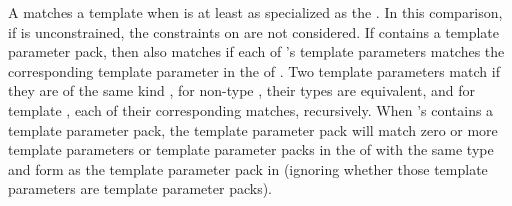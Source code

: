 \documentclass{wg21}
\begin{document}
\pnum
A  matches a template
  when 
 is at least as specialized as the  .
In this comparison, if  is unconstrained,
the constraints on  are not considered.
If  contains a template parameter pack, then  also matches 
if each of 's template parameters
matches the corresponding template parameter in the
 of .
Two template parameters match if they are of the same kind ,
for non-type , their types are
equivalent, and for template ,
each of their corresponding  matches, recursively.
When 's  contains a template parameter
pack, the template parameter pack will match zero or more template
parameters or template parameter packs in the  of
 with the same type and form as the template parameter pack in 
(ignoring whether those template parameters are template parameter packs).
\end{document}
